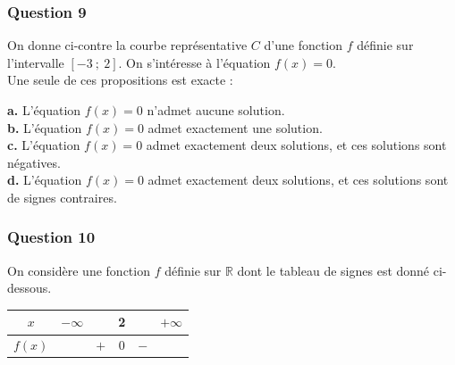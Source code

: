 \begin{minipage}[t]{0.6\textwidth}
\subsubsection*{Question 9}
On donne ci-contre la courbe représentative $C$ d'une fonction $f$ définie sur l'intervalle $[-3~;~2]$. On s'intéresse à l'équation $f(x) = 0$. \\
Une seule de ces propositions est exacte :

\textbf{a.} L'équation $f(x) = 0$ n'admet aucune solution. \\
\textbf{b.} L'équation $f(x) = 0$ admet exactement une solution. \\
\textbf{c.} L'équation $f(x) = 0$ admet exactement deux solutions, et ces solutions sont négatives. \\
\textbf{d.} L'équation $f(x) = 0$ admet exactement deux solutions, et ces solutions sont de signes contraires.
\end{minipage}
\hfill
\begin{minipage}[t]{0.35\textwidth}
\vspace{0pt}
\end{minipage}

\subsubsection*{Question 10}
On considère une fonction $f$ définie sur $\mathbb{R}$ dont le tableau de signes est donné ci-dessous.

\begin{center}
\begin{tabular}{|c|ccccc|}
\hline
$x$ & $-\infty$ & & 2 & & $+\infty$ \\
\hline
$f(x)$ & & $+$ & 0 & $-$ & \\
\hline
\end{tabular}
\end{center}

